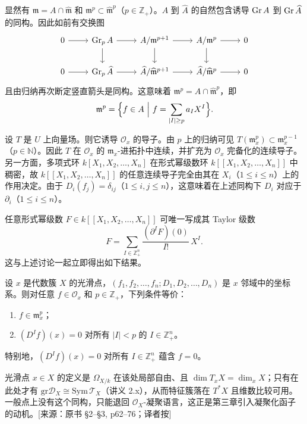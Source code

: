 显然有 $\mathfrak{m}=A\cap\widehat{\mathfrak{m}}$ 和 $\mathfrak{m}^p\subset\widehat{\mathfrak{m}}^p$（$p\in\mathbb{Z}_+$）。$A$ 到 $\widehat A$ 的自然包含诱导 $\operatorname{Gr} A$ 到 $\operatorname{Gr}\widehat A$ 的同构。因此如前有交换图
$$\begin{tikzcd}
0 \arrow[r] & \Gr_pA \arrow[r] \arrow[d] & A/\mathfrak{m}^{p+1} \arrow[r] \arrow[d] & A/\mathfrak{m}^p \arrow[r] \arrow[d] & 0\\
0 \arrow[r] & \Gr_p\widehat A \arrow[r] & \widehat A/\widehat{\mathfrak{m}}^{p+1} \arrow[r] & \widehat A/\widehat{\mathfrak{m}}^p \arrow[r] & 0
\end{tikzcd}$$
且由归纳再次断定竖直箭头是同构。这意味着 $\mathfrak{m}^p=A\cap\widehat{\mathfrak{m}}^p$，即
$$\mathfrak{m}^p=\Bigl\{f\in A\ \Big|\ f=\sum_{|I|\ge p}a_IX^I\Bigr\}.$$

设 $T$ 是 $U$ 上向量场。则它诱导 $\mathcal{O}_x$ 的导子。由 $p$ 上的归纳可见 $T(\mathfrak{m}_x^p)\subset\mathfrak{m}^{p-1}_x$（$p\in\mathbb{N}$）。因此 $T$ 在 $\mathcal{O}_x$ 的 $\mathfrak{m}_x$-进拓扑中连续，并扩充为 $\mathcal{O}_x$ 完备化的连续导子。另一方面，多项式环 $k[X_1,X_2,\dots,X_n]$ 在形式幂级数环 $k[[X_1,X_2,\dots,X_n]]$ 中稠密，故 $k[[X_1,X_2,\dots,X_n]]$ 的任意连续导子完全由其在 $X_i$（$1\le i\le n$）上的作用决定。由于 $D_i(f_j)=\delta_{ij}$（$1\le i,j\le n$），这意味着在上述同构下 $D_i$ 对应于 $\partial_i$（$1\le i\le n$）。

任意形式幂级数 $F\in k[[X_1,X_2,\dots,X_n]]$ 可唯一写成其 Taylor 级数
$$F=\sum_{I\in\mathbb{Z}_+^n}\frac{(\partial^IF)(0)}{I!}\,X^I.$$
这与上述讨论一起立即得出如下结果。

\begin{lemma}
设 $x$ 是代数簇 $X$ 的光滑点，$(f_1,f_2,\dots,f_n;D_1,D_2,\dots,D_n)$ 是 $x$ 邻域中的坐标系。则对任意 $f\in\mathcal{O}_x$ 和 $p\in\mathbb{Z}_+$，下列条件等价：
\begin{enumerate}[label=(\roman*)]
  \item $f\in\mathfrak{m}_x^p$；
  \item $(D^If)(x)=0$ 对所有 $|I|<p$ 的 $I\in\mathbb{Z}_+^n$。
\end{enumerate}
特别地，$(D^If)(x)=0$ 对所有 $I\in\mathbb{Z}_+^n$ 蕴含 $f=0$。
\end{lemma}
\begin{annote}
光滑点 $x\in X$ 的定义是 $\Omega_{X/k}$ 在该处局部自由、且 $\dim T_xX=\dim_xX$；只有在此处才有 $\mathrm{gr}\mathcal D_X\cong\mathrm{Sym}\,\mathcal T_X$（讲义 2.x），从而特征簇落在 $T^*X$ 且维数比较可用。一般点上没有这个同构，只能退回 $\mathcal O_X$-凝聚语言，这正是第三章引入凝聚化函子的动机。[来源：原书 §2–§3, p62–76；译者按]
\end{annote}



